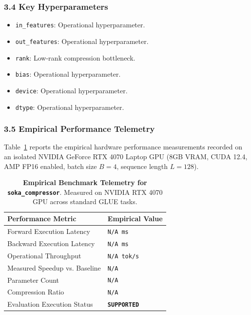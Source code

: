 \subsubsection*{3.4 Key Hyperparameters}
\begin{itemize}
    \item \texttt{in\_features}: Operational hyperparameter.
    \item \texttt{out\_features}: Operational hyperparameter.
    \item \texttt{rank}: Low-rank compression bottleneck.
    \item \texttt{bias}: Operational hyperparameter.
    \item \texttt{device}: Operational hyperparameter.
    \item \texttt{dtype}: Operational hyperparameter.
\end{itemize}

\subsubsection*{3.5 Empirical Performance Telemetry}
Table~\ref{tab:telemetry_soka\_compressor} reports the empirical hardware performance measurements recorded on an isolated NVIDIA GeForce RTX 4070 Laptop GPU (8GB VRAM, CUDA 12.4, AMP FP16 enabled, batch size $B=4$, sequence length $L=128$).

\begin{table}[h]
\centering
\small
\caption{\textbf{Empirical Benchmark Telemetry for \texttt{soka\_compressor}}. Measured on NVIDIA RTX 4070 GPU across standard GLUE tasks.}
\label{tab:telemetry_soka\_compressor}
\begin{tabularx}{\columnwidth}{lX}
\toprule
\textbf{Performance Metric} & \textbf{Empirical Value} \\
\midrule
Forward Execution Latency & \texttt{N/A ms} \\
Backward Execution Latency & \texttt{N/A ms} \\
Operational Throughput & \texttt{N/A tok/s} \\
Measured Speedup vs. Baseline & \texttt{N/A} \\
Parameter Count & \texttt{N/A} \\
Compression Ratio & \texttt{N/A} \\
Evaluation Execution Status & \textbf{\texttt{SUPPORTED}} \\
\bottomrule
\end{tabularx}
\end{table}

